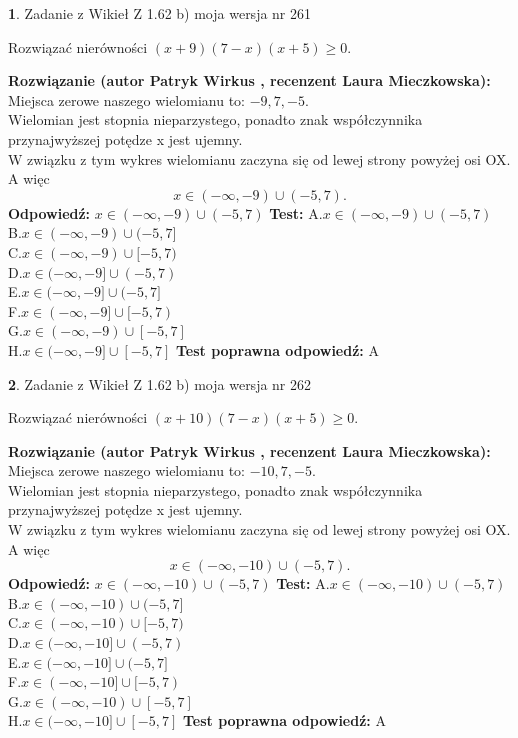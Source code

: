 \documentclass[12pt, a4paper]{article}
\theoremstyle{definition} %
\newtheorem{zad}{}
\newcommand{\zadStart}[1]{\begin{zad}#1\newline}
\newcommand{\zadStop}{\end{zad}}
\newcommand{\rozwStart}[2]{\noindent \textbf{Rozwiązanie (autor #1 , recenzent #2): }\newline}
\newcommand{\rozwStop}{\newline}
\newcommand{\odpStart}{\noindent \textbf{Odpowiedź:}\newline}
\newcommand{\odpStop}{\newline}
\newcommand{\testStart}{\noindent \textbf{Test:}\newline}
\newcommand{\testStop}{\newline}
\newcommand{\kluczStart}{\noindent \textbf{Test poprawna odpowiedź:}\newline}
\newcommand{\kluczStop}{\newline}
\begin{document}
\zadStart{Zadanie z Wikieł Z 1.62 b) moja wersja nr 261}

Rozwiązać nierówności $(x+9)(7-x)(x+5)\ge0$.
\zadStop
\rozwStart{Patryk Wirkus}{Laura Mieczkowska}
Miejsca zerowe naszego wielomianu to: $-9, 7, -5$.\\
Wielomian jest stopnia nieparzystego, ponadto znak współczynnika przy\linebreak najwyższej potędze x jest ujemny.\\ W związku z tym wykres wielomianu zaczyna się od lewej strony powyżej osi OX. A więc $$x \in (-\infty,-9) \cup (-5,7).$$
\rozwStop
\odpStart
$x \in (-\infty,-9) \cup (-5,7)$
\odpStop
\testStart
A.$x \in (-\infty,-9) \cup (-5,7)$\\
B.$x \in (-\infty,-9) \cup (-5,7]$\\
C.$x \in (-\infty,-9) \cup [-5,7)$\\
D.$x \in (-\infty,-9] \cup (-5,7)$\\
E.$x \in (-\infty,-9] \cup (-5,7]$\\
F.$x \in (-\infty,-9] \cup [-5,7)$\\
G.$x \in (-\infty,-9) \cup [-5,7]$\\
H.$x \in (-\infty,-9] \cup [-5,7]$
\testStop
\kluczStart
A
\kluczStop



\zadStart{Zadanie z Wikieł Z 1.62 b) moja wersja nr 262}

Rozwiązać nierówności $(x+10)(7-x)(x+5)\ge0$.
\zadStop
\rozwStart{Patryk Wirkus}{Laura Mieczkowska}
Miejsca zerowe naszego wielomianu to: $-10, 7, -5$.\\
Wielomian jest stopnia nieparzystego, ponadto znak współczynnika przy\linebreak najwyższej potędze x jest ujemny.\\ W związku z tym wykres wielomianu zaczyna się od lewej strony powyżej osi OX. A więc $$x \in (-\infty,-10) \cup (-5,7).$$
\rozwStop
\odpStart
$x \in (-\infty,-10) \cup (-5,7)$
\odpStop
\testStart
A.$x \in (-\infty,-10) \cup (-5,7)$\\
B.$x \in (-\infty,-10) \cup (-5,7]$\\
C.$x \in (-\infty,-10) \cup [-5,7)$\\
D.$x \in (-\infty,-10] \cup (-5,7)$\\
E.$x \in (-\infty,-10] \cup (-5,7]$\\
F.$x \in (-\infty,-10] \cup [-5,7)$\\
G.$x \in (-\infty,-10) \cup [-5,7]$\\
H.$x \in (-\infty,-10] \cup [-5,7]$
\testStop
\kluczStart
A
\kluczStop
\end{document}
